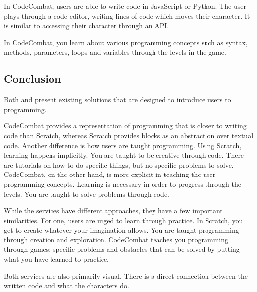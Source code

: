 In CodeCombat, users are able to write code in JavaScript or Python\cite{CodeCombatCodingGames}. The user plays through a code editor, writing lines of code which moves their character. It is similar to accessing their character through an API.

In CodeCombat, you learn about various programming concepts such as syntax, methods, parameters, loops and variables through the levels in the game\cite{CodeCombatCodingGames}.

\subsection{Conclusion}
Both  and  present existing solutions that are designed to introduce users to programming.

CodeCombat provides a representation of programming that is closer to writing code than Scratch, whereas Scratch provides blocks as an abstraction over textual code.
Another difference is how users are taught programming.
Using Scratch, learning happens implicitly.
You are taught to be creative through code. There are tutorials on how to do specific things, but no specific problems to solve.
CodeCombat, on the other hand, is more explicit in teaching the user programming concepts.
Learning is necessary in order to progress through the levels. You are taught to solve problems through code.

While the services have different approaches, they have a few important similarities.
For one, users are urged to learn through practice.
In Scratch, you get to create whatever your imagination allows. You are taught programming through creation and exploration.
CodeCombat teaches you programming through games; specific problems and obstacles that can be solved by putting what you have learned to practice.

Both services are also primarily visual.
There is a direct connection between the written code and what the characters do.